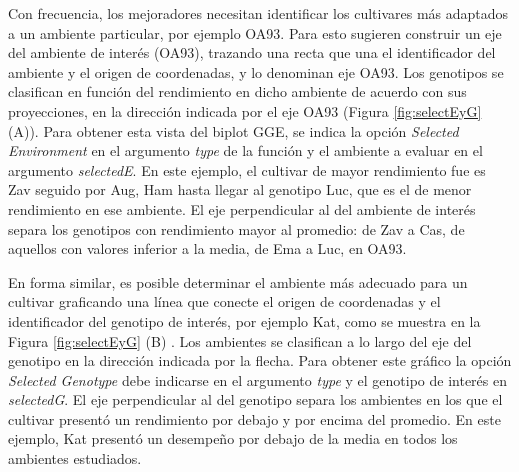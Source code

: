Con frecuencia, los mejoradores necesitan identificar los cultivares más adaptados a un ambiente particular, por ejemplo OA93. Para esto \citet{YanKang2003} sugieren construir un eje del ambiente de interés (OA93), trazando una recta que una el identificador del ambiente y el origen de coordenadas, y lo denominan eje OA93. Los genotipos se  clasifican en función del rendimiento en dicho ambiente de acuerdo con sus proyecciones, en la dirección indicada por el eje OA93 (Figura \ref{fig:selectEyG} (A)). Para obtener esta vista del biplot GGE, se indica la opción \emph{Selected Environment} en el argumento \emph{type} de la función y el ambiente a evaluar en el argumento  \emph{selectedE}. En este ejemplo, el cultivar de mayor rendimiento fue es Zav seguido por Aug, Ham hasta llegar al genotipo Luc, que es el de menor rendimiento en ese ambiente. El eje perpendicular al del ambiente de interés separa los genotipos con rendimiento mayor al promedio: de Zav a Cas, de aquellos con valores inferior a la media, de Ema a Luc, en OA93.
 
En forma similar, es posible determinar el ambiente más adecuado para un cultivar graficando una línea que conecte el origen de coordenadas y el identificador del genotipo de interés, por ejemplo Kat, como se muestra en la Figura \ref{fig:selectEyG} (B) \citep{YanKang2003}. Los ambientes se clasifican a lo largo del eje del genotipo en la dirección indicada por la flecha. Para obtener este gráfico la opción  \emph{Selected Genotype} debe indicarse en el argumento \emph{type} y el genotipo de interés en \emph{selectedG}. El eje perpendicular al del genotipo separa los ambientes en los que el cultivar presentó un rendimiento por debajo y por encima del promedio. En este ejemplo, Kat presentó un desempeño por debajo de la media en todos los ambientes estudiados. \\

